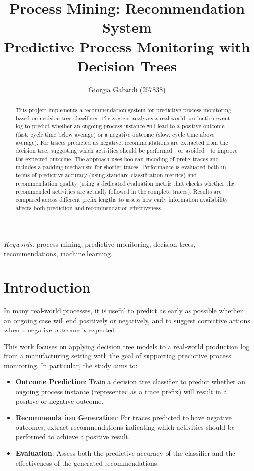 \documentclass{article}
\title{\textbf{Process Mining: Recommendation System} \\ {\Large Predictive Process Monitoring with Decision Trees}}
\author{Giorgia Gabardi (257838)}
\date{}
\begin{document}
\maketitle %


\begin{abstract}
\noindent
This project implements a recommendation system for predictive process monitoring based on decision tree classifiers. The system analyzes a real-world production event log to predict whether an ongoing process instance will lead to a positive outcome (fast: cycle time below average) or a negative outcome (slow: cycle time above average). For traces predicted as negative, recommendations are extracted from the decision tree, suggesting which activities should be performed---or avoided---to improve the expected outcome. The approach uses boolean encoding of prefix traces and includes a padding mechanism for shorter traces. Performance is evaluated both in terms of predictive accuracy (using standard classification metrics) and recommendation quality (using a dedicated evaluation metric that checks whether the recommended activities are actually followed in the complete traces). Results are compared across different prefix lengths to assess how early information availability affects both prediction and recommendation effectiveness.
\end{abstract}

\hspace*{3.6mm}\textit{Keywords:} process mining, predictive monitoring, decision trees, recommendations, machine learning.


\section{Introduction}

In many real-world processes, it is useful to predict as early as possible whether an ongoing case will end positively or negatively, and to suggest corrective actions when a negative outcome is expected.

\medskip
\noindent
This work focuses on applying decision tree models to a real-world production log from a manufacturing setting with the goal of supporting predictive process monitoring. In particular, the study aims to:
\begin{itemize}
    \item \textbf{Outcome Prediction}: Train a decision tree classifier to predict whether an ongoing process instance (represented as a trace prefix) will result in a positive or negative outcome.
    \item \textbf{Recommendation Generation}: For traces predicted to have negative outcomes, extract recommendations indicating which activities should be performed to achieve a positive result.
    \item \textbf{Evaluation}: Assess both the predictive accuracy of the classifier and the effectiveness of the generated recommendations.
\end{itemize}
\end{document}
